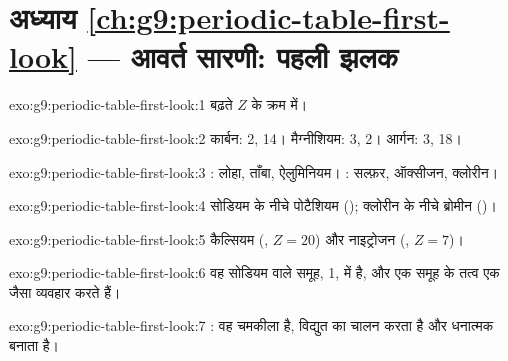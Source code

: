\section*{अध्याय \ref{ch:g9:periodic-table-first-look} --- आवर्त सारणी: पहली झलक}

\begin{solution}{exo:g9:periodic-table-first-look:1}
बढ़ते  $Z$ के क्रम में।
\end{solution}

\begin{solution}{exo:g9:periodic-table-first-look:2}
कार्बन:  2,  14। मैग्नीशियम:  3,  2। आर्गन:
 3,  18।
\end{solution}

\begin{solution}{exo:g9:periodic-table-first-look:3}
: लोहा, ताँबा, ऐलुमिनियम। : सल्फ़र, ऑक्सीजन, क्लोरीन।
\end{solution}

\begin{solution}{exo:g9:periodic-table-first-look:4}
सोडियम के नीचे पोटैशियम (); क्लोरीन के नीचे ब्रोमीन ()।
\end{solution}

\begin{solution}{exo:g9:periodic-table-first-look:5}
कैल्सियम (, $Z = 20$) और नाइट्रोजन (, $Z = 7$)।
\end{solution}

\begin{solution}{exo:g9:periodic-table-first-look:6}
वह सोडियम वाले समूह,  1, में है, और एक समूह के तत्व एक जैसा व्यवहार
करते हैं।
\end{solution}

\begin{solution}{exo:g9:periodic-table-first-look:7}
: वह चमकीला है, विद्युत का चालन करता है और धनात्मक  बनाता है।
\end{solution}

